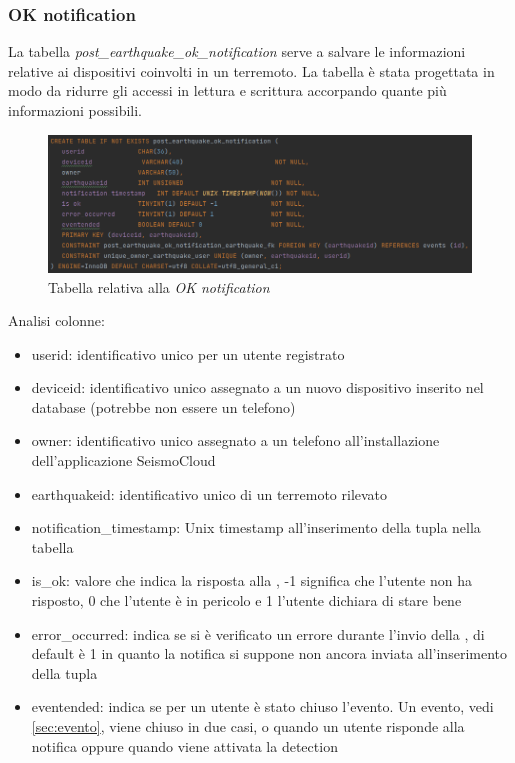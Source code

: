 \documentclass[main.tex]{subfiles}
\begin{document}
\subsubsection{OK notification}
La tabella \emph{post\_earthquake\_ok\_notification} serve a salvare le informazioni relative ai dispositivi coinvolti in un terremoto. La tabella è stata progettata in modo da ridurre gli accessi in lettura e scrittura accorpando quante più informazioni possibili.
\begin{figure}[H]
    \centering
    \includegraphics[width=1\linewidth]{img/Post-Earthquake/post-ok-notification-updated.png}
    \caption{Tabella relativa alla \emph{OK notification}}
    \label{fig:ok-not-table}
\end{figure}
Analisi colonne:
\begin{itemize}
    \item userid: identificativo unico per un utente registrato
    \item deviceid: identificativo unico assegnato a un nuovo dispositivo inserito nel database (potrebbe non essere un telefono)
    \item owner: identificativo unico assegnato a un telefono all'installazione dell'applicazione SeismoCloud
    \item earthquakeid: identificativo unico di un terremoto rilevato
    \item notification\_timestamp: Unix timestamp all'inserimento della tupla nella tabella
    \item is\_ok: valore che indica la risposta alla , -1 significa che l'utente non ha risposto, 0 che l'utente è in pericolo e 1 l'utente dichiara di stare bene
    \item error\_occurred: indica se si è verificato un errore durante l'invio della , di default è 1 in quanto la notifica si suppone non ancora inviata all'inserimento della tupla
    \item eventended: indica se per un utente è stato chiuso l'evento. Un evento, vedi \ref{sec:evento}, viene chiuso in due casi, o quando un utente risponde alla notifica oppure quando viene attivata la detection
\end{itemize}
\end{document}
